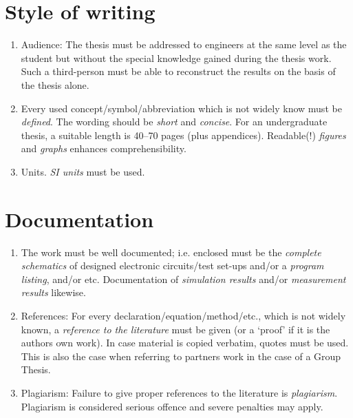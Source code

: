 \section{Style of writing}

\begin{enumerate}

\item Audience:
The thesis must be addressed to engineers at the same level as the
student but without the special knowledge gained during the thesis work.
Such a third-person must be able to reconstruct the results on the basis
of the thesis alone.

\item
Every used concept/symbol/abbreviation which is not widely know must be \emph{defined}.
The wording should be \emph{short} and \emph{concise}.  
For an undergraduate thesis, a suitable length
is 40--70 pages (plus appendices).
Readable(!) \emph{figures} and \emph{graphs} enhances comprehensibility.

\item Units.
\emph{SI units} must be used.
\end{enumerate}

\section{Documentation}

\begin{enumerate}
\item
The work must be well documented; i.e. enclosed must be the \emph{complete
schematics} of designed electronic circuits/test set-ups and/or a
\emph{program listing}, and/or etc.
Documentation of \emph{simulation results} and/or \emph{measurement
results} likewise.
\item References:
For every declaration/equation/method/etc., which is not widely known,
a \emph{reference to the literature} must be given (or a `proof' if it is
the authors own work).
In case material is copied verbatim, quotes must be used.
This is also the case when referring to partners
work in the case of a Group Thesis.

\item Plagiarism:
Failure to give proper references to the literature is \emph{plagiarism}.
Plagiarism is considered serious offence and severe penalties may apply.

\end{enumerate}

